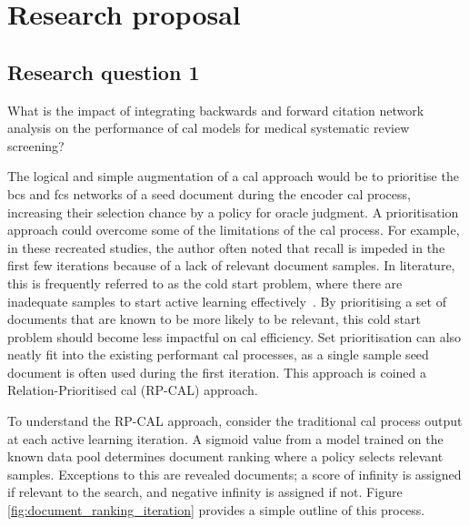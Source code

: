 \documentclass[10pt,oneside]{book}
\begin{document}
\chapter{Research proposal}\label{sec:Research_Proposal}

\section{Research question 1}

\begin{tcolorbox}[colback=skyblue!10, colframe=skyblue, sharp corners=southwest, boxrule=0.8pt]
What is the impact of integrating backwards and forward citation network analysis on the performance of \gls*{cal} models for medical systematic review screening?
\end{tcolorbox}

The logical and simple augmentation of a \gls*{cal} approach would be to prioritise the \gls*{bcs} and \gls*{fcs} networks of a seed document during the encoder \gls*{cal} process, increasing their selection chance by a policy for oracle judgment. A prioritisation approach could overcome some of the limitations of the \gls*{cal} process. For example, in these recreated studies, the author often noted that recall is impeded in the first few iterations because of a lack of relevant document samples. In literature, this is frequently referred to as the cold start problem, where there are inadequate samples to start active learning effectively~\cite{chen_making_2024}. By prioritising a set of documents that are known to be more likely to be relevant, this cold start problem should become less impactful on \gls*{cal} efficiency. Set prioritisation can also neatly fit into the existing performant \gls*{cal} processes, as a single sample seed document is often used during the first iteration. This approach is coined a Relation-Prioritised \gls*{cal} (RP-CAL) approach.

To understand the RP-CAL approach, consider the traditional \gls*{cal} process output at each active learning iteration. A sigmoid value from a model trained on the known data pool determines document ranking where a policy selects relevant samples. Exceptions to this are revealed documents; a score of infinity is assigned if relevant to the search, and negative infinity is assigned if not. Figure \ref{fig:document_ranking_iteration} provides a simple outline of this process.
\end{document}
